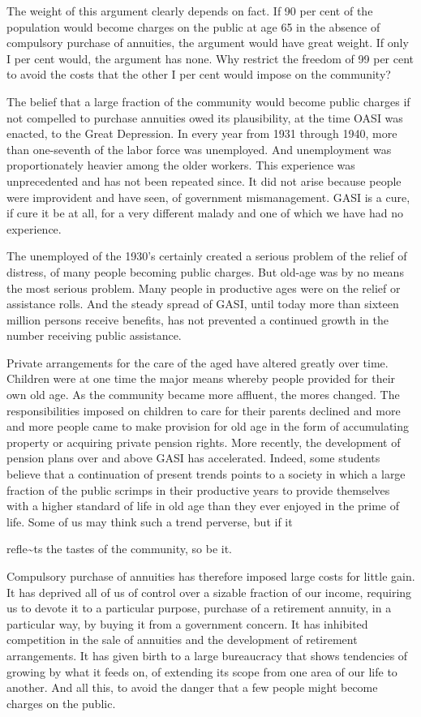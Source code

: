 \documentclass[11pt,openany]{book}
\begin{document}
The weight of this argument clearly depends on fact. If 90 per cent of the population would become charges on the public at age 65 in the absence of compulsory purchase of annuities, the argument would have great weight. If only I per cent would, the argument has none. Why restrict the freedom of 99 per cent to avoid the costs that the other I per cent would impose on the community?

The belief that a large fraction of the community would become public charges if not compelled to purchase annuities owed its plausibility, at the time OASI was enacted, to the Great Depression. In every year from 1931 through 1940, more than one-seventh of the labor force was unemployed. And unemployment was proportionately heavier among the older workers. This experience was unprecedented and has not been repeated since. It did not arise because people were improvident and have seen, of government mismanagement. GASI is a cure, if cure it be at all, for a very different malady and one of which we have had no experience.

The unemployed of the 1930's certainly created a serious problem of the relief of distress, of many people becoming public charges. But old-age was by no means the most serious problem. Many people in productive ages were on the relief or assistance rolls. And the steady spread of GASI, until today more than sixteen million persons receive benefits, has not prevented a continued growth in the number receiving public assistance.

Private arrangements for the care of the aged have altered greatly over time. Children were at one time the major means whereby people provided for their own old age. As the community became more affluent, the mores changed. The responsibilities imposed on children to care for their parents declined and more and more people came to make provision for old age in the form of accumulating property or acquiring private pension rights. More recently, the development of pension plans over and above GASI has accelerated. Indeed, some students believe that a continuation of present trends points to a society in which a large fraction of the public scrimps in their productive years to provide themselves with a higher standard of life in old age than they ever enjoyed in the prime of life. Some of us may think such a trend perverse, but if it

refle\textasciitilde{}ts the tastes of the community, so be it.

Compulsory purchase of annuities has therefore imposed large costs for little gain. It has deprived all of us of control over a sizable fraction of our income, requiring us to devote it to a particular purpose, purchase of a retirement annuity, in a particular way, by buying it from a government concern. It has inhibited competition in the sale of annuities and the development of retirement arrangements. It has given birth to a large bureaucracy that shows tendencies of growing by what it feeds on, of extending its scope from one area of our life to another. And all this, to avoid the danger that a few people might become charges on the public.
\end{document}

